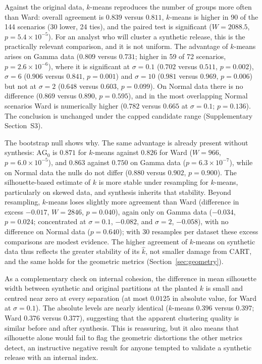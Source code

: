 \documentclass[pdflatex,referee]{sn-jnl}
\begin{document}
Against the original data, $k$-means reproduces the number of groups more
often than Ward: overall agreement is $0.839$ versus $0.811$, $k$-means is
higher in 90 of the 144 scenarios (30 lower, 24 ties), and the paired test is
significant ($W = 2088.5$, $p = 5.4 \times 10^{-5}$). For an analyst who will
cluster a synthetic release, this is the practically relevant comparison, and
it is not uniform. The advantage of $k$-means arises on Gamma data ($0.809$
versus $0.731$; higher in 59 of 72 scenarios, $p = 2.6 \times 10^{-6}$),
where it is significant at $\sigma = 0.1$ ($0.702$ versus $0.511$,
$p = 0.002$), $\sigma = 6$ ($0.906$ versus $0.841$, $p = 0.001$) and
$\sigma = 10$ ($0.981$ versus $0.969$, $p = 0.006$) but not at $\sigma = 2$
($0.648$ versus $0.603$, $p = 0.099$). On Normal data there is no difference
($0.869$ versus $0.890$, $p = 0.595$), and in the most overlapping Normal
scenarios Ward is numerically higher ($0.782$ versus $0.665$ at
$\sigma = 0.1$; $p = 0.136$). The conclusion is unchanged under the capped
candidate range (Supplementary Section~S3).

The bootstrap null shows why. The same advantage is already present without
synthesis: $\mathrm{AG}_0$ is $0.871$ for $k$-means against $0.826$ for Ward
($W = 966$, $p = 6.0 \times 10^{-5}$), and $0.863$ against $0.750$ on Gamma
data ($p = 6.3 \times 10^{-7}$), while on Normal data the nulls do not differ
($0.880$ versus $0.902$, $p = 0.900$). The silhouette-based estimate of $k$ is
more stable under resampling for $k$-means, particularly on skewed data, and
synthesis inherits that stability. Beyond resampling, $k$-means loses slightly
more agreement than Ward (difference in excess $-0.017$, $W = 2846$,
$p = 0.040$), again only on Gamma data ($-0.034$, $p = 0.024$; concentrated at
$\sigma = 0.1$, $-0.082$, and $\sigma = 2$, $-0.058$), with no difference on
Normal data ($p = 0.640$); with 30 resamples per dataset these excess
comparisons are modest evidence. The higher agreement of $k$-means on
synthetic data thus reflects the greater stability of its $\hat{k}$, not
smaller damage from CART, and the same holds for the geometric metrics
(Section~\ref{sec:geometry}).

As a complementary check on internal cohesion, the difference in mean
silhouette width between synthetic and original partitions at the planted $k$
is small and centred near zero at every separation (at most $0.0125$ in
absolute value, for Ward at $\sigma = 0.1$). The absolute levels are nearly
identical ($k$-means $0.396$ versus $0.397$; Ward $0.376$ versus $0.377$),
suggesting that the apparent clustering quality is similar before and after
synthesis. This is reassuring, but it also means that silhouette alone would
fail to flag the geometric distortions the other metrics detect, an
instructive negative result for anyone tempted to validate a synthetic release
with an internal index.
\end{document}
